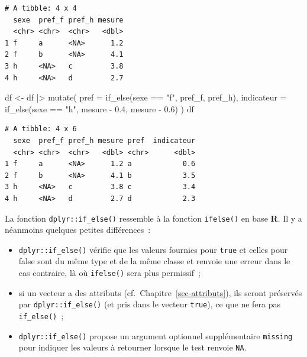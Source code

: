 \documentclass[
  letterpaper,
  DIV=11,
  numbers=noendperiod,
  oneside]{scrreprt}
\newenvironment{Shaded}{\begin{snugshade}}{\end{snugshade}}
\newcommand{\AttributeTok}[1]{\textcolor[rgb]{0.40,0.45,0.13}{#1}}
\newcommand{\FloatTok}[1]{\textcolor[rgb]{0.68,0.00,0.00}{#1}}
\newcommand{\FunctionTok}[1]{\textcolor[rgb]{0.28,0.35,0.67}{#1}}
\newcommand{\NormalTok}[1]{\textcolor[rgb]{0.00,0.23,0.31}{#1}}
\newcommand{\OtherTok}[1]{\textcolor[rgb]{0.00,0.23,0.31}{#1}}
\newcommand{\SpecialCharTok}[1]{\textcolor[rgb]{0.37,0.37,0.37}{#1}}
\newcommand{\StringTok}[1]{\textcolor[rgb]{0.13,0.47,0.30}{#1}}
\providecommand{\tightlist}{%
  \setlength{\itemsep}{0pt}\setlength{\parskip}{0pt}}\usepackage{longtable,booktabs,array}
\begin{document}
\begin{verbatim}
# A tibble: 4 x 4
  sexe  pref_f pref_h mesure
  <chr> <chr>  <chr>   <dbl>
1 f     a      <NA>      1.2
2 f     b      <NA>      4.1
3 h     <NA>   c         3.8
4 h     <NA>   d         2.7
\end{verbatim}

\begin{Shaded}
\begin{Highlighting}[]
\NormalTok{df }\OtherTok{\textless{}{-}} 
\NormalTok{  df }\SpecialCharTok{|\textgreater{}} 
  \FunctionTok{mutate}\NormalTok{(}
    \AttributeTok{pref =} \FunctionTok{if\_else}\NormalTok{(sexe }\SpecialCharTok{==} \StringTok{"f"}\NormalTok{, pref\_f, pref\_h),}
    \AttributeTok{indicateur =} \FunctionTok{if\_else}\NormalTok{(sexe }\SpecialCharTok{==} \StringTok{"h"}\NormalTok{, mesure }\SpecialCharTok{{-}} \FloatTok{0.4}\NormalTok{, mesure }\SpecialCharTok{{-}} \FloatTok{0.6}\NormalTok{)}
\NormalTok{  )}
\NormalTok{df}
\end{Highlighting}
\end{Shaded}

\begin{verbatim}
# A tibble: 4 x 6
  sexe  pref_f pref_h mesure pref  indicateur
  <chr> <chr>  <chr>   <dbl> <chr>      <dbl>
1 f     a      <NA>      1.2 a            0.6
2 f     b      <NA>      4.1 b            3.5
3 h     <NA>   c         3.8 c            3.4
4 h     <NA>   d         2.7 d            2.3
\end{verbatim}

\begin{tcolorbox}[enhanced jigsaw, colbacktitle=quarto-callout-important-color!10!white, opacityback=0, toprule=.15mm, colback=white, coltitle=black, bottomtitle=1mm, toptitle=1mm, titlerule=0mm, rightrule=.15mm, title=\textcolor{quarto-callout-important-color}{\faExclamation}\hspace{0.5em}{if\_else() et ifelse()}, breakable, bottomrule=.15mm, opacitybacktitle=0.6, arc=.35mm, left=2mm, leftrule=.75mm, colframe=quarto-callout-important-color-frame]

La fonction \texttt{dplyr::if\_else()} ressemble à la fonction
\texttt{ifelse()} en base \textbf{R}. Il y a néanmoins quelques petites
différences~:

\begin{itemize}
\tightlist
\item
  \texttt{dplyr::if\_else()} vérifie que les valeurs fournies pour
  \texttt{true} et celles pour false sont du même type et de la même
  classe et renvoie une erreur dans le cas contraire, là où
  \texttt{ifelse()} sera plus permissif~;
\item
  si un vecteur a des attributs (cf.~Chapitre~\ref{sec-attributs}), ils
  seront préservés par \texttt{dplyr::if\_else()} (et pris dans le
  vecteur \texttt{true}), ce que ne fera pas \texttt{if\_else()}~;
\item
  \texttt{dplyr::if\_else()} propose un argument optionnel
  supplémentaire \texttt{missing} pour indiquer les valeurs à retourner
  lorsque le test renvoie \texttt{NA}.
\end{itemize}

\end{tcolorbox}
\end{document}
